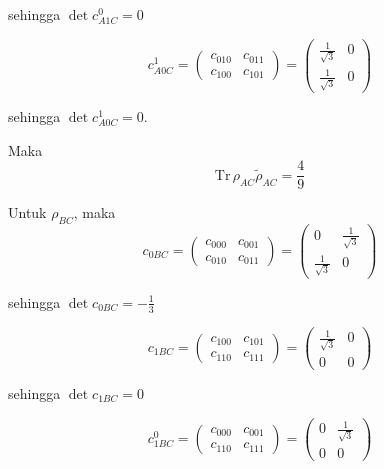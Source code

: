 sehingga $\det c_{A1C}^0 = 0$

\begin{equation}
	c_{A0C}^1=
	\begin{pmatrix}
		c_{010} & c_{011} \\
		c_{100} & c_{101}
	\end{pmatrix}=
	\begin{pmatrix}
		\frac{1}{\sqrt{3}} & 0 \\
		\frac{1}{\sqrt{3}} & 0
	\end{pmatrix}
\end{equation}

sehingga $\det c_{A0C}^1 = 0$.

Maka
\begin{equation}
	\mathrm{Tr}\,\rho_{AC}\tilde{\rho}_{AC}=\frac{4}{9}
\end{equation}

Untuk $\rho_{BC}$, maka
\begin{equation}
	c_{0BC}=
	\begin{pmatrix}
		c_{000} & c_{001} \\
		c_{010} & c_{011}
	\end{pmatrix}=
	\begin{pmatrix}
		0 & \frac{1}{\sqrt{3}} \\
		\frac{1}{\sqrt{3}} & 0
	\end{pmatrix}
\end{equation}

sehingga $\det c_{0BC} = -\frac{1}{3}$

\begin{equation}
	c_{1BC}=
	\begin{pmatrix}
		c_{100} & c_{101} \\
		c_{110} & c_{111}
	\end{pmatrix}=
	\begin{pmatrix}
		\frac{1}{\sqrt{3}} & 0 \\
		0 & 0
	\end{pmatrix}
\end{equation}

sehingga $\det c_{1BC} = 0$

\begin{equation}
	c_{1BC}^0=
	\begin{pmatrix}
		c_{000} & c_{001} \\
		c_{110} & c_{111}
	\end{pmatrix}=
	\begin{pmatrix}
		0 & \frac{1}{\sqrt{3}} \\
		0 & 0
	\end{pmatrix}
\end{equation}

